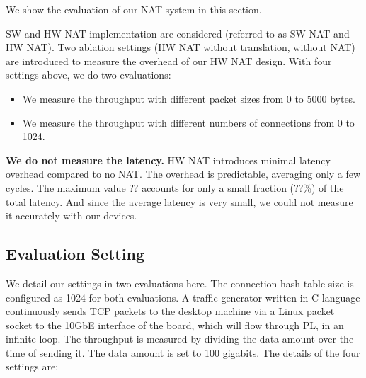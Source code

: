 We show the evaluation of our NAT system in this section.

SW and HW NAT implementation are considered (referred to as SW NAT and HW NAT). Two ablation settings (HW NAT without translation, without NAT) are introduced to measure the overhead of our HW NAT design.
With four settings above, we do two evaluations:
\begin{itemize}
    \item We measure the throughput with different packet sizes from 0 to 5000 bytes.
    \item We measure the throughput with different numbers of connections from 0 to 1024.
\end{itemize}


\textbf{We do not measure the latency.} HW NAT introduces minimal latency overhead compared to no NAT. The overhead is predictable, averaging only a few cycles. The maximum value ?? accounts for only a small fraction (??\%) of the total latency. And since the average latency is very small, we could not measure it accurately with our devices.

\subsection{Evaluation Setting}

We detail our settings in two evaluations here. The connection hash table size is configured as 1024 for both evaluations. A traffic generator written in C language continuously sends TCP packets to the desktop machine via a Linux packet socket to the 10GbE interface of the board, which will flow through PL, in an infinite loop. The throughput is measured by dividing the data amount over the time of sending it. The data amount is set to 100 gigabits.
The details of the four settings are:

